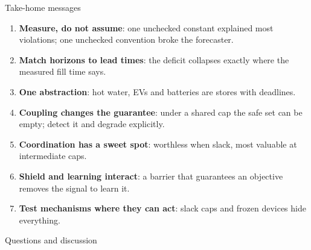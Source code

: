 \documentclass[aspectratio=169,10pt]{beamer}
\begin{document}
\begin{frame}{Take-home messages}
\begin{enumerate}
  \item \textbf{Measure, do not assume}: one unchecked constant explained most violations; one unchecked convention broke the forecaster.
  \item \textbf{Match horizons to lead times}: the deficit collapses exactly where the measured fill time says.
  \item \textbf{One abstraction}: hot water, EVs and batteries are stores with deadlines.
  \item \textbf{Coupling changes the guarantee}: under a shared cap the safe set can be empty; detect it and degrade explicitly.
  \item \textbf{Coordination has a sweet spot}: worthless when slack, most valuable at intermediate caps.
  \item \textbf{Shield and learning interact}: a barrier that guarantees an objective removes the signal to learn it.
  \item \textbf{Test mechanisms where they can act}: slack caps and frozen devices hide everything.
\end{enumerate}
\vspace{0.6em}
\centering\Large Questions and discussion
\end{frame}
\end{document}
